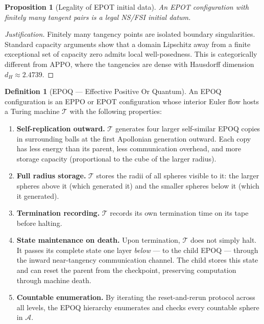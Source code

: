 \documentclass[11pt]{article}
\theoremstyle{plain}
\newtheorem{proposition}[theorem]{Proposition}
\theoremstyle{definition}
\newtheorem{definition}{Definition}
\theoremstyle{remark}
\begin{document}
\begin{proposition}[Legality of EPOT initial data]
\label{prop:epot_legal}
An EPOT configuration with finitely many tangent pairs is a legal NS/FSI
initial datum.
\end{proposition}

\begin{proof}[Justification]
Finitely many tangency points are isolated boundary singularities. Standard
capacity arguments show that a domain Lipschitz away from a finite
exceptional set of capacity zero admits local well-posedness. This is
categorically different from APPO, where the tangencies are dense with
Hausdorff dimension $d_H \approx 2.4739$.
\end{proof}

\begin{definition}[EPOQ --- Effective Positive Or Quantum]
\label{def:epoq}
An EPOQ configuration is an EPPO or EPOT configuration whose interior Euler
flow hosts a Turing machine $\mathcal{T}$ with the following properties:

\begin{enumerate}
  \item \textbf{Self-replication outward.} $\mathcal{T}$ generates four
  larger self-similar EPOQ copies in surrounding balls at the first
  Apollonian generation outward. Each copy has less energy than its parent,
  less communication overhead, and more storage capacity (proportional to
  the cube of the larger radius).

  \item \textbf{Full radius storage.} $\mathcal{T}$ stores the radii of all
  spheres visible to it: the larger spheres above it (which generated it)
  and the smaller spheres below it (which it generated).

  \item \textbf{Termination recording.} $\mathcal{T}$ records its own
  termination time on its tape before halting.

  \item \textbf{State maintenance on death.} Upon termination, $\mathcal{T}$
  does not simply halt. It passes its complete state one layer \emph{below}
  --- to the child EPOQ --- through the inward near-tangency communication
  channel. The child stores this state and can reset the parent from the
  checkpoint, preserving computation through machine death.

  \item \textbf{Countable enumeration.} By iterating the reset-and-rerun
  protocol across all levels, the EPOQ hierarchy enumerates and checks every
  countable sphere in $\mathcal{A}$.
\end{enumerate}
\end{definition}
\end{document}
